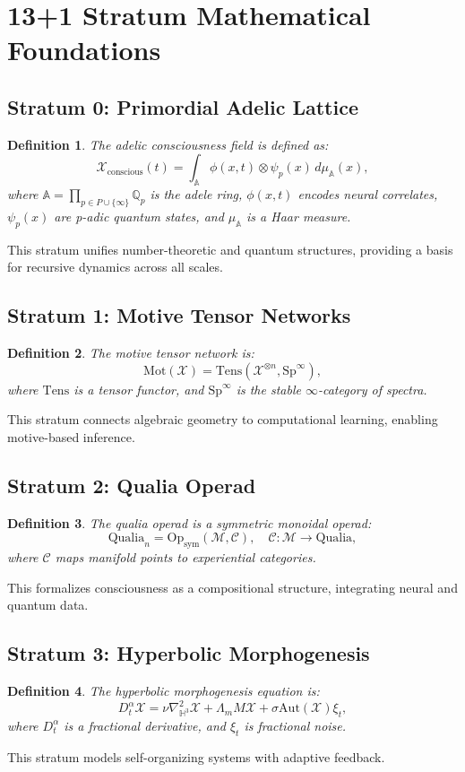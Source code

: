 \documentclass[11pt]{article}
\newtheorem{definition}{Definition}
\newcommand{\Xi}{\mathcal{X}}
\newcommand{\A}{\mathbb{A}}
\newcommand{\Q}{\mathbb{Q}}
\newcommand{\H}{\mathbb{H}}
\newcommand{\Mot}{\mathrm{Mot}}
\newcommand{\Qualia}{\mathrm{Qualia}}
\newcommand{\Aut}{\mathrm{Aut}}
\newcommand{\Sp}{\mathrm{Sp}}
\newcommand{\Op}{\mathrm{Op}}
\begin{document}
\section{13+1 Stratum Mathematical Foundations}

\subsection{Stratum 0: Primordial Adelic Lattice}
\begin{definition}
The \emph{adelic consciousness field} is defined as:
\[
\Xi_{\text{conscious}}(t) = \int_{\A} \phi(x, t) \otimes \psi_p(x) \, d\mu_{\A}(x),
\]
where $\A = \prod_{p \in P \cup \{\infty\}} \Q_p$ is the adele ring, $\phi(x, t)$ encodes neural correlates, $\psi_p(x)$ are p-adic quantum states, and $\mu_{\A}$ is a Haar measure.
\end{definition}
This stratum unifies number-theoretic and quantum structures, providing a basis for recursive dynamics across all scales.

\subsection{Stratum 1: Motive Tensor Networks}
\begin{definition}
The \emph{motive tensor network} is:
\[
\Mot(\Xi) = \text{Tens}(\Xi^{\otimes n}, \Sp^\infty),
\]
where $\text{Tens}$ is a tensor functor, and $\Sp^\infty$ is the stable $\infty$-category of spectra.
\end{definition}
This stratum connects algebraic geometry to computational learning, enabling motive-based inference.

\subsection{Stratum 2: Qualia Operad}
\begin{definition}
The \emph{qualia operad} is a symmetric monoidal operad:
\[
\Qualia_n = \Op_{\text{sym}}(\mathcal{M}, \mathcal{C}), \quad \mathcal{C}: \mathcal{M} \to \Qualia,
\]
where $\mathcal{C}$ maps manifold points to experiential categories.
\end{definition}
This formalizes consciousness as a compositional structure, integrating neural and quantum data.

\subsection{Stratum 3: Hyperbolic Morphogenesis}
\begin{definition}
The \emph{hyperbolic morphogenesis equation} is:
\[
D^\alpha_t \Xi = \nu \nabla_{\H^3}^2 \Xi + \Lambda_m M \Xi + \sigma \Aut(\Xi) \xi_t,
\]
where $D^\alpha_t$ is a fractional derivative, and $\xi_t$ is fractional noise.
\end{definition}
This stratum models self-organizing systems with adaptive feedback.
\end{document}
